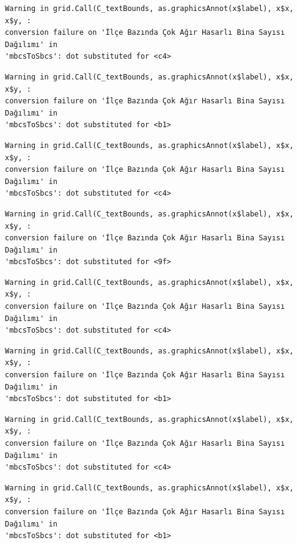 \documentclass[
  11pt,
  a4paper,
  DIV=11,
  numbers=noendperiod]{scrartcl}
\begin{document}
\begin{verbatim}
Warning in grid.Call(C_textBounds, as.graphicsAnnot(x$label), x$x, x$y, :
conversion failure on 'İlçe Bazında Çok Ağır Hasarlı Bina Sayısı Dağılımı' in
'mbcsToSbcs': dot substituted for <c4>
\end{verbatim}

\begin{verbatim}
Warning in grid.Call(C_textBounds, as.graphicsAnnot(x$label), x$x, x$y, :
conversion failure on 'İlçe Bazında Çok Ağır Hasarlı Bina Sayısı Dağılımı' in
'mbcsToSbcs': dot substituted for <b1>
\end{verbatim}

\begin{verbatim}
Warning in grid.Call(C_textBounds, as.graphicsAnnot(x$label), x$x, x$y, :
conversion failure on 'İlçe Bazında Çok Ağır Hasarlı Bina Sayısı Dağılımı' in
'mbcsToSbcs': dot substituted for <c4>
\end{verbatim}

\begin{verbatim}
Warning in grid.Call(C_textBounds, as.graphicsAnnot(x$label), x$x, x$y, :
conversion failure on 'İlçe Bazında Çok Ağır Hasarlı Bina Sayısı Dağılımı' in
'mbcsToSbcs': dot substituted for <9f>
\end{verbatim}

\begin{verbatim}
Warning in grid.Call(C_textBounds, as.graphicsAnnot(x$label), x$x, x$y, :
conversion failure on 'İlçe Bazında Çok Ağır Hasarlı Bina Sayısı Dağılımı' in
'mbcsToSbcs': dot substituted for <c4>
\end{verbatim}

\begin{verbatim}
Warning in grid.Call(C_textBounds, as.graphicsAnnot(x$label), x$x, x$y, :
conversion failure on 'İlçe Bazında Çok Ağır Hasarlı Bina Sayısı Dağılımı' in
'mbcsToSbcs': dot substituted for <b1>
\end{verbatim}

\begin{verbatim}
Warning in grid.Call(C_textBounds, as.graphicsAnnot(x$label), x$x, x$y, :
conversion failure on 'İlçe Bazında Çok Ağır Hasarlı Bina Sayısı Dağılımı' in
'mbcsToSbcs': dot substituted for <c4>
\end{verbatim}

\begin{verbatim}
Warning in grid.Call(C_textBounds, as.graphicsAnnot(x$label), x$x, x$y, :
conversion failure on 'İlçe Bazında Çok Ağır Hasarlı Bina Sayısı Dağılımı' in
'mbcsToSbcs': dot substituted for <b1>
\end{verbatim}
\end{document}
